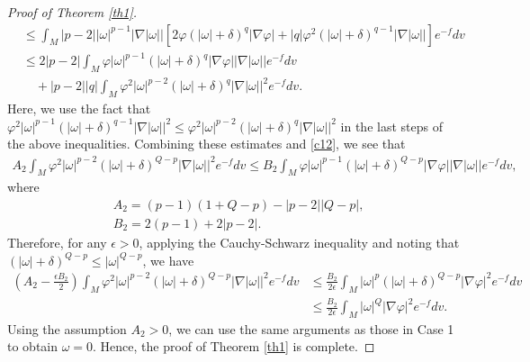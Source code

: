 \documentclass[leqno,12pt]{article} %
\theoremstyle{plain} %
\theoremstyle{definition} %
\numberwithin{equation}{section}
\begin{document}
\begin{proof}[Proof of Theorem \ref{th1}]
\begin{align}
		&\le  \int_M |p-2||\omega|^{p-1} |\nabla |\omega|| \left[ 2\varphi (|\omega|+\delta)^q |\nabla \varphi|+|q| \varphi^2 (|\omega|+\delta)^{q-1} |\nabla |\omega||  \right] e^{-f} dv\\\nonumber
		&\le 2|p-2| \int_M \varphi |\omega|^{p-1} (|\omega|+\delta)^{q}  |\nabla \varphi||\nabla|\omega||e^{-f}dv\\
		& \quad + |p-2||q| \int_M  \varphi^2 |\omega|^{p-2} (|\omega|+\delta)^{q} |\nabla|\omega||^2 e^{-f}dv.
	\end{align}
	Here, we use the fact that $\varphi^2 |\omega|^{p-1} (|\omega|+\delta)^{q-1} |\nabla|\omega||^2\le \varphi^2 |\omega|^{p-2} (|\omega|+\delta)^{q} |\nabla|\omega||^2$ in the last steps of the above inequalities. Combining these estimates and \eqref{c12}, we see that
	\begin{align}\nonumber
		A_2 \int_M \varphi^2 |\omega|^{p-2} (|\omega|+\delta)^{Q-p}|\nabla|\omega||^2 e^{-f}dv \le B_2 \int_M \varphi |\omega|^{p-1} (|\omega|+\delta)^{Q-p}|\nabla \varphi||\nabla|\omega||e^{-f}dv,
	\end{align}
	where
	\begin{align*}
		&A_2=(p-1)(1+Q-p)-|p-2||Q-p|,\\
		&B_2=2(p-1)+2|p-2|.
	\end{align*}
	Therefore, for any $\epsilon>0$, applying the Cauchy-Schwarz inequality and noting that $(|\omega|+\delta)^{Q-p}\le |\omega|^{Q-p}$, we have
	\begin{align}\nonumber
		\left(A_2-\frac{\epsilon B_2}{2}\right) \int_M \varphi^2 |\omega|^{p-2}(|\omega|+\delta)^{Q-p}|\nabla|\omega||^2 e^{-f}dv &\le \frac{B_2}{2\epsilon} \int_M |\omega|^{p} (|\omega|+\delta)^{Q-p}|\nabla \varphi|^2e^{-f}dv\\ \nonumber
				&\le \frac{B_2}{2\epsilon} \int_M |\omega|^{Q} |\nabla \varphi|^2e^{-f}dv.
	\end{align}
Using the assumption $A_2>0$, we can use the same arguments as those in Case 1 to obtain $\omega=0$. Hence, the proof of Theorem \ref{th1} is complete.	
\end{proof}
\end{document}
